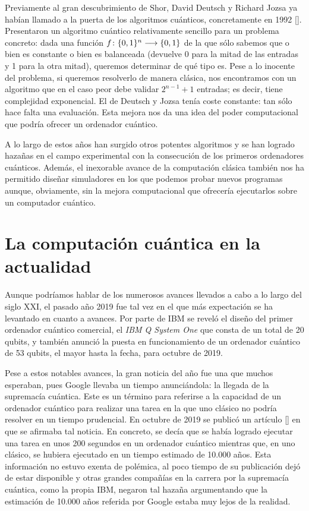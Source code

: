 Previamente al gran descubrimiento de Shor, David Deutsch y Richard Jozsa ya habían llamado a la puerta de los algoritmos cuánticos, concretamente en 1992 [\cite{deutsch1992rapid}]. Presentaron un algoritmo cuántico relativamente sencillo para un problema concreto: dada una función $f\colon \{0,1\}^n\longrightarrow \{0,1\}$ de la que sólo sabemos que o bien es constante o bien es balanceada (devuelve 0 para la mitad de las entradas y 1 para la otra mitad), queremos determinar de qué tipo es. Pese a lo inocente del problema, si queremos resolverlo de manera clásica, nos encontramos con un algoritmo que en el caso peor debe validar  $2^{n-1}+1$ entradas; es decir, tiene complejidad exponencial. El de Deutsch y Jozsa tenía coste constante: tan sólo hace falta una evaluación. Esta mejora nos da una idea del poder computacional que podría ofrecer un ordenador cuántico.

A lo largo de estos años han surgido otros potentes algoritmos y se han logrado hazañas en el campo experimental con la consecución de los primeros ordenadores cuánticos. Además, el inexorable avance de la computación clásica también nos ha permitido diseñar simuladores en los que podemos probar nuevos programas aunque, obviamente, sin la mejora computacional que ofrecería ejecutarlos sobre un computador cuántico.

\section{La computación cuántica en la actualidad}
Aunque podríamos hablar de los numerosos avances llevados a cabo a lo largo del siglo XXI, el pasado año 2019 fue tal vez en el que más expectación se ha levantado en cuanto a avances. Por parte de IBM se reveló el diseño del primer ordenador cuántico comercial, el \textit{IBM Q System One} que consta de un total de 20 qubits, y también anunció la puesta en funcionamiento de un ordenador cuántico de 53 qubits, el mayor hasta la fecha, para octubre de 2019.

Pese a estos notables avances, la gran noticia del año fue una que muchos esperaban, pues Google llevaba un tiempo anunciándola: la llegada de la supremacía cuántica. Este es un término para referirse a la capacidad de un ordenador cuántico para realizar una tarea en la que uno clásico no podría resolver en un tiempo prudencial. En octubre de 2019 se publicó un artículo [\cite{arute2019quantum}] en que se afirmaba tal noticia. En concreto, se decía que se había logrado ejecutar una tarea en unos 200 segundos en un ordenador cuántico mientras que, en uno clásico, se hubiera ejecutado en un tiempo estimado de 10.000 años. Esta información no estuvo exenta de polémica, al poco tiempo de su publicación dejó de estar disponible y otras grandes compañías en la carrera por la supremacía cuántica, como la propia IBM, negaron tal hazaña argumentando que la estimación de 10.000 años referida por Google estaba muy lejos de la realidad.

